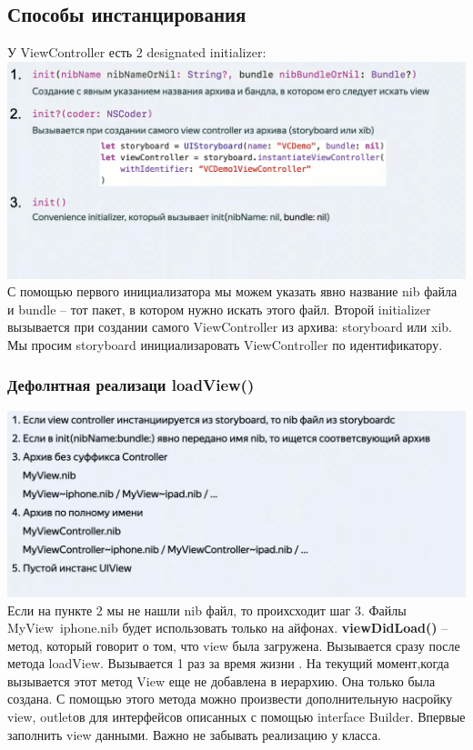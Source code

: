 \documentclass{article}
\begin{document}
    \subsection{Способы инстанцирования}
    У ViewController есть 2 designated initializer:
    \newline
    \includegraphics[scale = 0.3]{pic/Снимок экрана 2023-08-02 в 21.09.14.png}
    \newline
    С помощью первого инициализатора мы можем указать явно название nib файла и bundle -- тот пакет, в котором нужно искать этого файл. 
    \newline
    Второй initializer вызывается при создании самого ViewController из архива: storyboard или xib. Мы просим storyboard инициализаровать ViewController по идентификатору. 
    \subsubsection{Дефолнтная реализаци loadView()}
    \includegraphics[scale = 0.3]{pic/Снимок экрана 2023-08-02 в 21.20.49.png}
    \newline
    Если на пункте 2 мы не нашли nib файл, то проихсходит шаг 3. Файлы MyView~iphone.nib будет использовать только на айфонах. 
    \newline
    \textbf{viewDidLoad()} -- метод, который говорит о том, что view была загружена. Вызывается сразу после метода loadView. Вызывается 1 раз за время жизни . На текущий момент,когда вызывается этот метод View еще не добавлена в иерархию. Она только была создана. 
    \newline
    С помощью этого метода можно произвести дополнительную насройку view, outletов для интерфейсов описанных с помощью interface Builder. Впервые заполнить view данными. Важно не забывать реализацию у  класса. 
\end{document}
